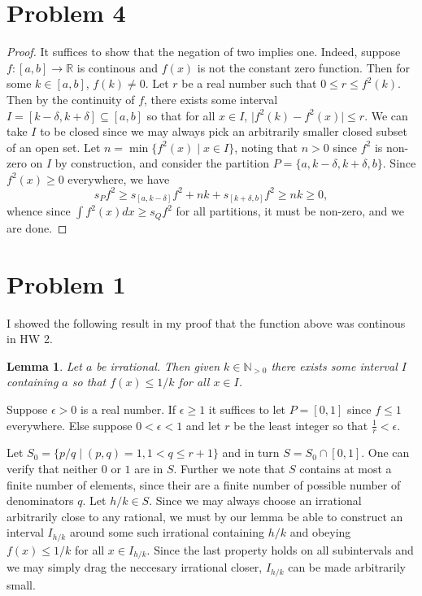 \documentclass{report}
\providecommand{\abs}[1]{\lvert#1\rvert}
\providecommand{\R}{\mathbb{R}}
\providecommand{\N}{\mathbb{N}}
\DeclareMathOperator{\min}{min}
\newtheorem{lemma}{Lemma}
\begin{document}
\section{Problem 4}
\begin{proof}
  It suffices to show that the negation of two implies one. Indeed, suppose $f:[a,b]\to \R$ is continous and $f(x)$ is not the constant zero function. Then for some $k\in [a,b]$, $f(k)\neq 0$. Let $r$ be a real number such that $0\leq r\leq f^{2}(k)$. Then by the continuity of $f$, there exists some interval $I=[k-\delta, k+\delta]\subseteq [a,b]$ so that for all $x\in I$, $\abs{f^{2}(k)-f^{2}(x)}\leq r$. We can take $I$ to be closed since we may always pick an arbitrarily smaller closed subset of an open set. Let $n=\min\{f^{2}(x)\mid x\in I\}$, noting that $n>0$ since $f^{2}$ is non-zero on $I$ by construction, and consider the partition $P=\{a,k-\delta, k+\delta, b\}$. Since $f^{2}(x)\geq 0$ everywhere, we have
  \[
    s_{P}f^{2}\geq s_{[a,k-\delta]}f^{2}+nk+s_{[k+\delta,b]}f^{2}\geq nk\geq 0,
  \]
  whence since $\int f^{2}(x)dx\geq s_{Q}f^{2}$ for all partitions, it must be non-zero, and we are done.
\end{proof}


\section{Problem 1}
I showed the following result in my proof that the function above was continous in HW 2. 
\begin{lemma}
  Let $a$ be irrational. Then given $k\in \N_{>0}$ there exists some interval $I$ containing $a$ so that $f(x)\leq 1/k$ for all $x\in I$.
\end{lemma}

Suppose $\epsilon>0$ is a real number. If $\epsilon\geq 1$ it suffices to let $P=[0,1]$ since $f\leq 1$ everywhere. Else suppose $0< \epsilon<1$ and let $r$ be the least integer so that $\frac{1}{r}<\epsilon$.

Let $S_{0}=\{p/q\mid (p,q)=1, 1<q\leq r+1 \}$ and in turn $S=S_{0}\cap [0,1]$. One can verify that neither $0$ or $1$ are in $S$. Further we note that $S$ contains at most a finite number of elements, since their are a finite number of possible number of denominators $q$.
Let $h/k\in S$. Since we may always choose an irrational arbitrarily close to any rational, we must by our lemma be able to construct an interval $I_{h/k}$ around some such irrational containing $h/k$ and obeying $f(x)\leq 1/k$ for all $x\in I_{h/k}$. Since the last property holds on all subintervals and we may simply drag the neccesary irrational closer, $I_{h/k}$ can be made arbitrarily small.
\end{document}
